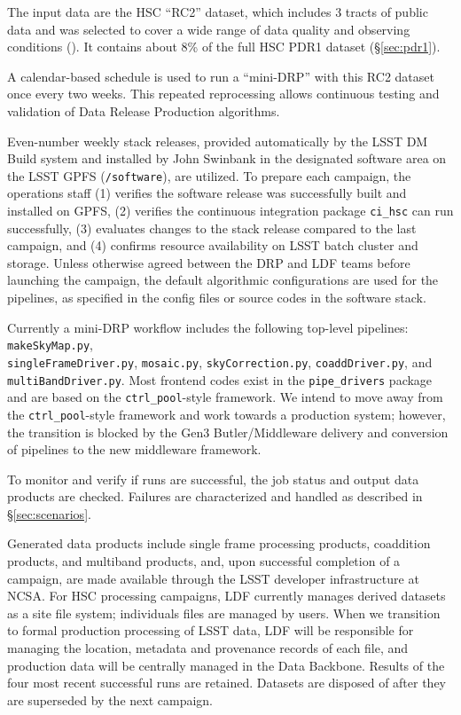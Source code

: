 \documentclass[DM,authoryear,toc]{lsstdoc}
\begin{document}
The input data are the HSC “RC2” dataset, which includes 3 tracts
of public data and was selected to cover a wide range of data quality
and observing conditions (). It contains about 8\% of the
full HSC PDR1 dataset (\S \ref{sec:pdr1}).

A calendar-based schedule is used to run a “mini-DRP” with this RC2
dataset once every two weeks. This repeated reprocessing allows
continuous testing and validation of Data Release Production
algorithms.

Even-number weekly stack releases, provided automatically by the
LSST DM Build system and installed by John Swinbank in the designated
software area on the LSST GPFS (\texttt{/software}), are utilized.
To prepare each campaign, the operations staff (1) verifies the
software release was successfully built and installed on GPFS, (2)
verifies the continuous integration package \texttt{ci\_hsc}
can run successfully, (3) evaluates changes to the stack release
compared to the last campaign, and (4) confirms resource availability
on LSST batch cluster and storage. Unless otherwise agreed between
the DRP and LDF teams before launching the campaign, the default
algorithmic configurations are used for the pipelines, as specified
in the config files or source codes in the software stack.

Currently a mini-DRP workflow includes the following top-level pipelines:
\texttt{makeSkyMap.py},\\ \texttt{singleFrameDriver.py}, \texttt{mosaic.py},
\texttt{skyCorrection.py}, \texttt{coaddDriver.py}, and
\texttt{multiBandDriver.py}. Most frontend codes exist in the
\texttt{pipe\_drivers} package and are based on the \texttt{ctrl\_pool}-style
framework. We intend to move away from the \texttt{ctrl\_pool}-style framework
and work towards a production system; however, the transition is
blocked by the Gen3 Butler/Middleware delivery and conversion of
pipelines to the new middleware framework.

To monitor and verify if runs are successful, the job status and
output data products are checked. Failures are characterized and
handled as described in \S \ref{sec:scenarios}.

Generated data products include single frame processing products,
coaddition products, and multiband products, and, upon successful
completion of a campaign, are made available through the LSST
developer infrastructure at NCSA.  For HSC processing campaigns,
LDF currently manages derived datasets as a site file system;
individuals files are managed by users. When we transition to formal
production processing of LSST data, LDF will be responsible for
managing the location, metadata and provenance records of each file,
and production data will be centrally managed in the Data Backbone.
Results of the four most recent successful runs are retained.  Datasets are
disposed of after they are superseded by the next campaign.
\end{document}
